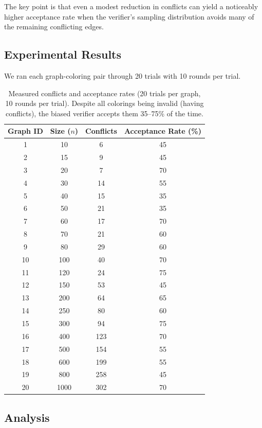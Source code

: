 \documentclass[11pt]{article}
\begin{document}
The key point is that even a modest reduction in conflicts can yield a noticeably higher acceptance rate when the verifier's sampling distribution avoids many of the remaining conflicting edges.

\subsection{Experimental Results}

We ran each graph-coloring pair through 20 trials with 10 rounds per trial.

\begin{table}[h]
\centering
\begin{tabular}{@{}cccc@{}}
\toprule
\textbf{Graph ID} & \textbf{Size ($n$)} & \textbf{Conflicts} & \textbf{Acceptance Rate (\%)} \\ \midrule
1  & 10   & 6   & 45 \\
2  & 15   & 9   & 45 \\
3  & 20   & 7   & 70 \\
4  & 30   & 14  & 55 \\
5  & 40   & 15  & 35 \\
6  & 50   & 21  & 35 \\
7  & 60   & 17  & 70 \\
8  & 70   & 21  & 60 \\
9  & 80   & 29  & 60 \\
10 & 100  & 40  & 70 \\
11 & 120  & 24  & 75 \\
12 & 150  & 53  & 45 \\
13 & 200  & 64  & 65 \\
14 & 250  & 80  & 60 \\
15 & 300  & 94  & 75 \\
16 & 400  & 123 & 70 \\
17 & 500  & 154 & 55 \\
18 & 600  & 199 & 55 \\
19 & 800  & 258 & 45 \\
20 & 1000 & 302 & 70 \\ \bottomrule
\end{tabular}
\caption{Measured conflicts and acceptance rates (20 trials per graph, 10 rounds per trial). Despite all colorings being invalid (having conflicts), the biased verifier accepts them 35--75\% of the time.}
\label{tab:results}
\end{table}

\subsection{Analysis}
\end{document}
